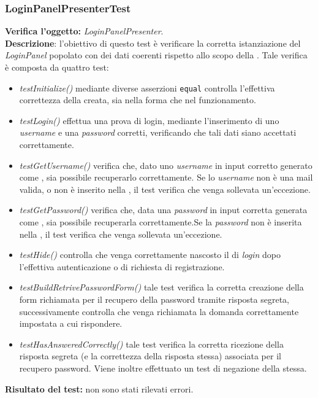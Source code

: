 \subsubsection{LoginPanelPresenterTest}
\textbf{Verifica l'oggetto:} \textit{LoginPanelPresenter}.\\
\textbf{Descrizione}: l'obiettivo di questo test è verificare la corretta istanziazione del \textit{LoginPanel} popolato con dei dati coerenti rispetto allo scopo della .
Tale verifica è composta da quattro test:
\begin{itemize} 
\item \textit{testInitialize()} mediante diverse asserzioni \texttt{equal} controlla l'effettiva correttezza della  creata, sia nella forma che nel funzionamento.
\item \textit{testLogin() } effettua una prova di login, mediante l'inserimento di uno \textit{username} e una \textit{password} corretti, verificando che tali dati siano accettati correttamente.
\item \textit{testGetUsername()} verifica che, dato uno \textit{username} in input corretto generato come , sia possibile recuperarlo correttamente. Se lo \textit{username} non è una mail valida, o non è inserito nella , il test verifica che venga sollevata un'eccezione.
\item \textit{testGetPassword() } verifica che, data una \textit{password} in input corretta generata come , sia possibile recuperarla correttamente.Se la \textit{password} non è inserita nella , il test verifica che venga sollevata un'eccezione.
\item \textit{testHide()} controlla che venga correttamente nascosto il  di \textit{login} dopo l'effettiva autenticazione o di richiesta di registrazione.
\item \textit{testBuildRetrivePasswordForm()} tale test verifica la corretta creazione della form richiamata per il recupero della password tramite risposta segreta, successivamente controlla che venga richiamata la domanda correttamente impostata a cui rispondere.
\item \textit{testHasAnsweredCorrectly()} tale test verifica la corretta ricezione della risposta segreta (e la correttezza della risposta stessa) associata per il recupero password. Viene inoltre effettuato un test di negazione della stessa.
\end{itemize}
\textbf{Risultato del test:} non sono stati rilevati errori.

